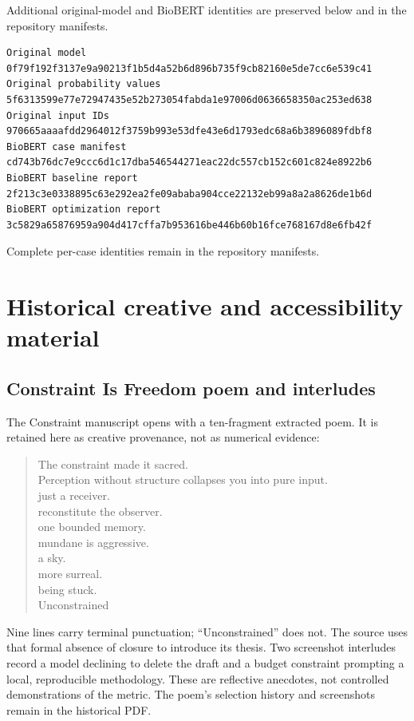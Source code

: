 Additional original-model and BioBERT identities are preserved below and in the repository manifests.
\begin{lstlisting}
Original model
0f79f192f3137e9a90213f1b5d4a52b6d896b735f9cb82160e5de7cc6e539c41
Original probability values
5f6313599e77e72947435e52b273054fabda1e97006d0636658350ac253ed638
Original input IDs
970665aaaafdd2964012f3759b993e53dfe43e6d1793edc68a6b3896089fdbf8
BioBERT case manifest
cd743b76dc7e9ccc6d1c17dba546544271eac22dc557cb152c601c824e8922b6
BioBERT baseline report
2f213c3e0338895c63e292ea2fe09ababa904cce22132eb99a8a2a8626de1b6d
BioBERT optimization report
3c5829a65876959a904d417cffa7b953616be446b60b16fce768167d8e6fb42f
\end{lstlisting}
Complete per-case identities remain in the repository manifests.

\section{Historical creative and accessibility material}
\subsection{Constraint Is Freedom poem and interludes}
The Constraint manuscript opens with a ten-fragment extracted poem. It is retained here as creative provenance, not as numerical evidence:
\begin{quote}
The constraint made it sacred.\\
Perception without structure collapses you into pure input.\\
just a receiver.\\
reconstitute the observer.\\
one bounded memory.\\
mundane is aggressive.\\
a sky.\\
more surreal.\\
being stuck.\\
Unconstrained
\end{quote}
Nine lines carry terminal punctuation; ``Unconstrained'' does not. The source uses that formal absence of closure to introduce its thesis. Two screenshot interludes record a model declining to delete the draft and a budget constraint prompting a local, reproducible methodology. These are reflective anecdotes, not controlled demonstrations of the metric. The poem's selection history and screenshots remain in the historical PDF.


